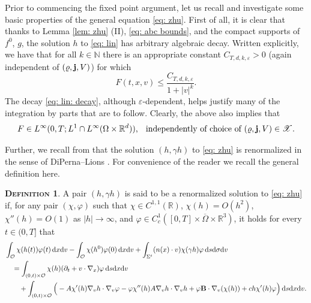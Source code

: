 \documentclass[10pt, reqno]{amsart}
\theoremstyle{plain}
\theoremstyle{definition}
\newtheorem{definition}[theorem]{\normalfont \scshape Definition}
\theoremstyle{remark}
\numberwithin{equation}{section}
\newcommand{\bfj}{{\bf j}}
\newcommand{\bfB}{{\bf B}}
\newcommand{\bbN}{\mathbb N}
\newcommand{\calO}{\mathcal O}
\newcommand{\p}{\partial}
\newcommand{\R}{\mathbb{R}}
\newcommand{\ve}{\varepsilon}
\newcommand{\dx}{\textnormal{d}x}
\newcommand{\dv}{\textnormal{d}v}
\newcommand{\ds}{\textnormal{d}s}
\newcommand{\tnd}{\textnormal{d}}
\begin{document}
Prior to commencing the fixed point argument, let us recall and investigate some basic properties of the general equation \eqref{eq: zhu}. First of all, it is clear that thanks to Lemma \ref{lem: zhu} (II), \eqref{eq: abc bounds}, and the compact supports of $f^0$, $g$, the solution $h$ to \eqref{eq: lin} has arbitrary algebraic decay. Written explicitly, we have that for all $k\in \bbN$ there is an appropriate constant $C_{T,d,k,\ve}>0$ (again independent of $(\varrho, \bfj, V)$) for which
\begin{equation}\label{eq: lin: decay}
    F(t,x,v) \le \frac{C_{T,d,k,\ve}}{1 + |v|^k}.
\end{equation}
The decay \eqref{eq: lin: decay}, although $\ve$-dependent, helps justify many of the integration by parts that are to follow. Clearly, the above also implies that
\begin{equation} \label{eq: lin: Lp unif in X}
\textnormal{$ F \in L^\infty(0,T; L^1 \cap L^\infty(\Omega\times\R^d))$, \; independently of choice of $(\varrho, \bfj, V) \in \mathscr{X}$}.
\end{equation}

Further, we recall from \cite[Lemma 2.5]{Zhu24} that the solution $(h, \gamma h)$ to \eqref{eq: zhu} is renormalized in the sense of DiPerna--Lions \cite{DipernaLionsODE1989}. For convenience of the reader we recall the general definition here.

\begin{definition}
A pair $(h,\gamma h)$ is said to be a renormalized solution to \eqref{eq: zhu} if, for any pair $(\chi,\varphi)$ such that $\chi \in C^{1,1}(\R)$, $\chi(h) = O(h^2)$, $\chi''(h) = O(1)$ as $|h|\to\infty$, and $\varphi\in C_c^1([0,T]\times\overline{\Omega}\times\R^3)$, it holds for every $t\in (0,T]$ that
    \begin{align*}
        &\int_{\calO} \chi(h(t)) \varphi(t) \,\dx\dv - \int_{\calO} \chi(h^0) \varphi(0) \,\dx\dv + \int_{\Sigma^t} (n(x)\cdot v) \chi(\gamma h) \varphi \,\ds\tnd\sigma\dv\\
        &\quad= \int_{(0,t)\times\calO} \chi(h) (\p_t+v\cdot \nabla_x)\varphi \,\ds\dx\dv \\
        &\qquad + \int_{(0,t)\times\calO} \Big(- A \chi'(h) \nabla_v h \cdot \nabla_v \varphi - \varphi \chi''(h) A\nabla_v h \cdot \nabla_v h + \varphi \bfB \cdot \nabla_v (\chi(h)) + c h \chi'(h) \varphi \Big) \,\ds\dx\dv .
    \end{align*}
\end{definition}
\end{document}
